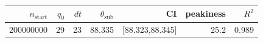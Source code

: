 \begin{tabular}{r r r r r r r}
\hline
$n_{\mathrm{start}}$ & $q_0$ & $dt$ & $\theta_{\mathrm{sub}}$ & CI & peakiness & $R^2$ \\
\hline
200000000 & 29 & 23 & 88.335 & [88.323,88.345] & 25.2 & 0.989 \\
\hline
\end{tabular}
